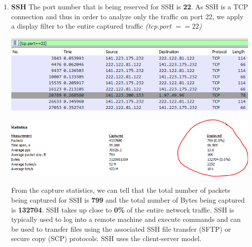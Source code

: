 \documentclass[a4paper,11pt]{article}
\begin{document}
\begin{enumerate}
	\item \textbf{SSH}
	\newline
	The port number that is being reserved for SSH is \textbf{22}. As SSH is a TCP connection and thus in order to analyze only the traffic on port 22, we apply a display filter to the 		entire captured traffic \textit{(tcp.port $== 22$)}\newline
	\begin{minipage}{3in}
	\centering
		\includegraphics[width = 16cm]{sshfilter}
		\captionsetup{justification=centering}
	\end{minipage}
	\newline\newline
	\begin{minipage}{5in}
	\centering
		\includegraphics[width = 16cm]{sshpacketsnbytes}
		\captionsetup{justification=centering}
	\end{minipage}
	\newline\newline
	From the capture statistics, we can tell that the total number of packets being captured for SSH is \textbf{799} and the total number of Bytes being captured is \textbf{132704}. SSH takes up close to \textbf{0\%} of the entire network traffic. SSH is typically used to log into a remote machine and execute commands and can be used to transfer files using the associated SSH file transfer (SFTP) or secure copy (SCP) protocols. SSH uses the client-server model.\newline\newline
\begin{minipage}{5in}
	\centering

\end{minipage}
\end{enumerate}
\end{document}

